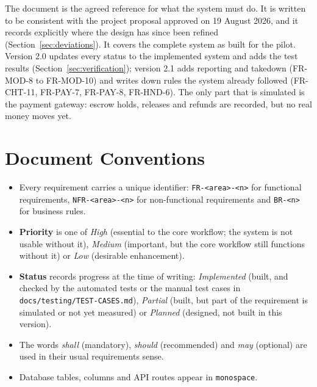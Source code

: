 \documentclass[11pt,a4paper]{scrreprt}
\begin{document}
The document is the agreed reference for what the system must do. It is
written to be consistent with the project proposal approved on
19 August 2026, and it records explicitly where the design has since been
refined (Section~\ref{sec:deviations}). It covers the complete system as
built for the pilot. Version 2.0 updates every status to the implemented
system and adds the test results (Section~\ref{sec:verification}); version
2.1 adds reporting and takedown (FR-MOD-8 to FR-MOD-10) and writes down rules
the system already followed (FR-CHT-11, FR-PAY-7, FR-PAY-8, FR-HND-6). The only
part that is simulated is the payment gateway: escrow holds, releases and
refunds are recorded, but no real money moves yet.

\section{Document Conventions}
\begin{itemize}
  \item Every requirement carries a unique identifier: \texttt{FR-<area>-<n>}
    for functional requirements, \texttt{NFR-<area>-<n>} for non-functional
    requirements and \texttt{BR-<n>} for business rules.
  \item \textbf{Priority} is one of \emph{High} (essential to the core
    workflow; the system is not usable without it), \emph{Medium}
    (important, but the core workflow still functions without it) or
    \emph{Low} (desirable enhancement).
  \item \textbf{Status} records progress at the time of writing:
    \emph{Implemented} (built, and checked by the automated tests or the
    manual test cases in \texttt{docs/testing/TEST-CASES.md}), \emph{Partial}
    (built, but part of the requirement is simulated or not yet measured) or
    \emph{Planned} (designed, not built in this version).
  \item The words \emph{shall} (mandatory), \emph{should} (recommended)
    and \emph{may} (optional) are used in their usual requirements sense.
  \item Database tables, columns and API routes appear in
    \texttt{monospace}.
\end{itemize}
\end{document}
